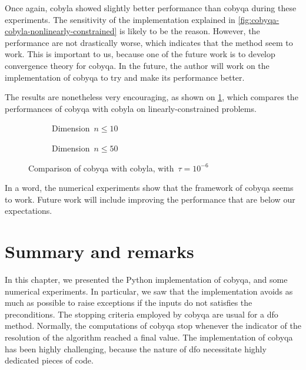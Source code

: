 Once again, \gls{cobyla} showed slightly better performance than \gls{cobyqa} during these experiments.
The sensitivity of the implementation explained in \cref{fig:cobyqa-cobyla-nonlinearly-constrained} is likely to be the reason.
However, the performance are not drastically worse, which indicates that the method seem to work.
This is important to us, because one of the future work is to develop convergence theory for \gls{cobyqa}.
In the future, the author will work on the implementation of \gls{cobyqa} to try and make its performance better.

The results are nonetheless very encouraging, as shown on \cref{fig:cobyqa-cobyla-linearly-constrained}, which compares the performances of \gls{cobyqa} with \gls{cobyla} on linearly-constrained problems.

\begin{figure}[ht]
    \centering
    \begin{subfigure}[b]{0.49\textwidth}
        \centering
        \caption{Dimension~$n \le 10$}
    \end{subfigure}
    \hfill
    \begin{subfigure}[b]{0.49\textwidth}
        \centering
        \caption{Dimension~$n \le 50$}
    \end{subfigure}
    \caption{Comparison of \gls{cobyqa} with \gls{cobyla}, with~$\tau = 10^{-6}$}
    \label{fig:cobyqa-cobyla-linearly-constrained}
\end{figure}

In a word, the numerical experiments show that the framework of \gls{cobyqa} seems to work.
Future work will include improving the performance that are below our expectations.

\section{Summary and remarks}

In this chapter, we presented the Python implementation of \gls{cobyqa}, and some numerical experiments.
In particular, we saw that the implementation avoids as much as possible to raise exceptions if the inputs do not satisfies the preconditions.
The stopping criteria employed by \gls{cobyqa} are usual for a \gls{dfo} method.
Normally, the computations of \gls{cobyqa} stop whenever the indicator of the resolution of the algorithm reached a final value.
The implementation of \gls{cobyqa} has been highly challenging, because the nature of \gls{dfo} necessitate highly dedicated pieces of code.

